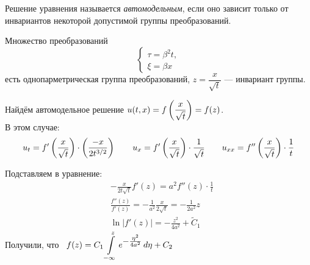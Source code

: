 \documentclass[../main.tex]{subfiles}
\begin{document}
\begin{definition}
Решение уравнения называется \textit{автомодельным}, если оно зависит только от инвариантов некоторой допустимой группы преобразований.
\end{definition}
\begin{example}
Множество преобразований
\begin{equation*}
\begin{cases}
	\tau = \beta^2 t, \\
	\xi = \beta x
\end{cases}
\end{equation*}
есть однопарметрическая группа преобразований, $z = \dfrac{x}{\sqrt{t}} $ --- инвариант группы.
\end{example}
Найдём автомодельное решение $u(t, x) = f\left(\dfrac{x}{\sqrt{t}}\right) = f(z)$. \\
В этом случае:
\begin{equation*}
	u_t = f'\left(\dfrac{x}{\sqrt{t}}\right) \cdot \left(\frac{-x}{2t^{3/2}}\right) 
	\qquad u_x = f'\left(\frac{x}{\sqrt{t}}\right) \cdot \frac{1}{\sqrt{t}} 
	\qquad u_{xx} = f''\left(\frac{x}{\sqrt{t}}\right) \cdot \frac{1}{t}
\end{equation*}

Подставляем в уравнение:
\vspace{-0.7em}
\begin{align*}
	&-\frac{x}{2t\sqrt{t}} f'(z) = a^2 f''(z) \cdot \frac{1}{t}\\[0.3em]
	&\frac{f''(z)}{f'(z)} = - \frac{1}{a^2} \frac{x}{2\sqrt t} = -\frac{1}{2 a^2} z\\[0.2em]
	&\ln|f'(z)| = -\frac{z^2}{4a^2} + \tilde{C}_1
\end{align*}
Получили, что \ $f(z) = C_1 \displaystyle \int\limits_{-\infty}^z e^{\textstyle -\frac{\eta^2}{4a^2}}\, d\eta + C_2$
\end{document}
